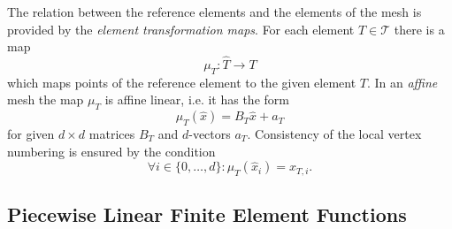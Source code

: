\documentclass[a4paper,12pt]{article}
\begin{document}
The relation between the reference elements and the elements of the mesh
is provided by the {\em element transformation maps}.
For each element $T\in\mathcal{T}$ there is a map
$$\mu_T : \hat T \to T$$ which maps points of the reference element to the
given element $T$. In an {\em affine} mesh the map $\mu_T$ is affine linear, i.e. it
has the form 
\begin{equation*}
\mu_T(\hat x) = B_T \hat x + a_T
\end{equation*}
for given $d\times d$ matrices $B_T$ and $d$-vectors $a_T$.
Consistency of the local vertex numbering is ensured by the condition
$$\forall i\in\{0,\ldots,d\} : \mu_T(\hat x_i) = x_{T,i}.$$

\subsection{Piecewise Linear Finite Element Functions}
\end{document}
